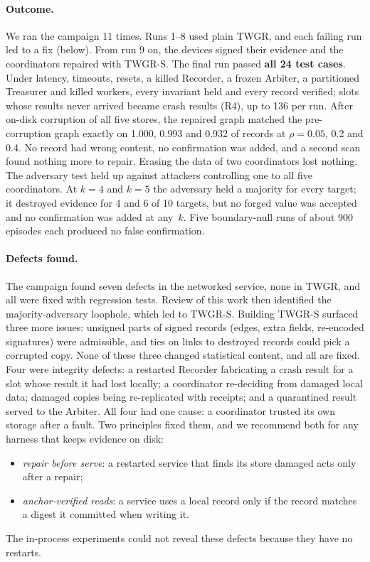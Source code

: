 \documentclass[pdflatex,sn-mathphys-num]{sn-jnl}
\theoremstyle{thmstyleone}
\theoremstyle{thmstyletwo}
\theoremstyle{thmstylethree}
\begin{document}
\paragraph{Outcome.} We ran the campaign 11 times. Runs 1--8 used plain TWGR, and each failing run led to a fix (below). From run 9 on, the devices signed their evidence and the coordinators repaired with TWGR-S. The final run passed \textbf{all 24 test cases}. Under latency, timeouts, resets, a killed Recorder, a frozen Arbiter, a partitioned Treasurer and killed workers, every invariant held and every record verified; slots whose results never arrived became crash results (R4), up to 136 per run. After on-disk corruption of all five stores, the repaired graph matched the pre-corruption graph exactly on 1.000, 0.993 and 0.932 of records at $\rho=0.05$, 0.2 and 0.4. No record had wrong content, no confirmation was added, and a second scan found nothing more to repair. Erasing the data of two coordinators lost nothing. The adversary test held up against attackers controlling one to all five coordinators. At $k=4$ and $k=5$ the adversary held a majority for every target; it destroyed evidence for 4 and 6 of 10 targets, but no forged value was accepted and no confirmation was added at any~$k$. Five boundary-null runs of about 900 episodes each produced no false confirmation.

\paragraph{Defects found.} The campaign found seven defects in the networked service, none in TWGR, and all were fixed with regression tests. Review of this work then identified the majority-adversary loophole, which led to TWGR-S. Building TWGR-S surfaced three more issues: unsigned parts of signed records (edges, extra fields, re-encoded signatures) were admissible, and ties on links to destroyed records could pick a corrupted copy. None of these three changed statistical content, and all are fixed. Four were integrity defects: a restarted Recorder fabricating a crash result for a slot whose result it had lost locally; a coordinator re-deciding from damaged local data; damaged copies being re-replicated with receipts; and a quarantined result served to the Arbiter. All four had one cause: a coordinator trusted its own storage after a fault. Two principles fixed them, and we recommend both for any harness that keeps evidence on disk:
\begin{itemize}
\item \emph{repair before serve}: a restarted service that finds its store damaged acts only after a repair;
\item \emph{anchor-verified reads}: a service uses a local record only if the record matches a digest it committed when writing it.
\end{itemize}
The in-process experiments could not reveal these defects because they have no restarts.
\end{document}
